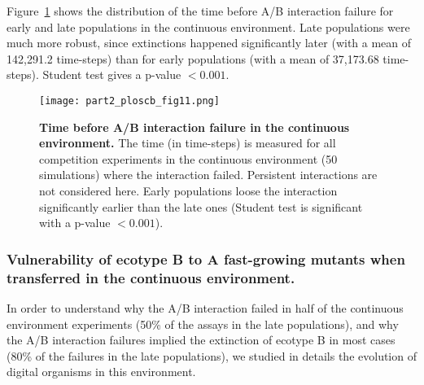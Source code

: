 Figure~\ref{fig:part2:first_result:Fig11} shows the distribution of the time before A/B interaction failure for early and late populations in the continuous environment. Late populations were much more robust, since extinctions happened significantly later (with a mean of 142,291.2 time-steps) than for early populations (with a mean of 37,173.68 time-steps). Student test gives a p-value $< 0.001$.

\begin{figure}[!h]
\centering
\texttt{[image: part2\_ploscb\_fig11.png]}
\caption[Time before A/B interaction failure in the continuous environment.]{{\bf Time before A/B interaction failure in the continuous environment.} The time (in time-steps) is measured for all competition experiments in the continuous environment (50 simulations) where the interaction failed. Persistent interactions are not considered here. Early populations loose the interaction significantly earlier than the late ones (Student test is significant with a p-value $< 0.001$).}
\label{fig:part2:first_result:Fig11}
\end{figure}


\subsubsection*{Vulnerability of ecotype B to A fast-growing mutants when transferred in the continuous environment.}

In order to understand why the A/B interaction failed in half of the continuous environment experiments (50\% of the assays in the late populations), and why the A/B interaction failures implied the extinction of ecotype B in most cases (80\% of the failures in the late populations), we studied in details the evolution of digital organisms in this environment.


